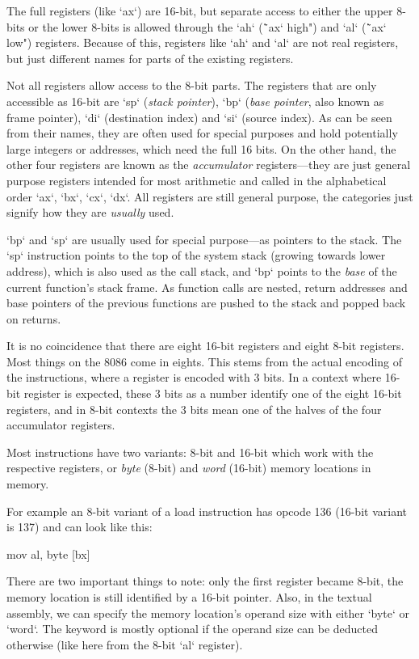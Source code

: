 The full registers (like
`ax`) are 16-bit, but separate access to either the upper 8-bits or the lower 8-bits
is allowed through the `ah` (\"`ax` high") and `al` (\"`ax` low") registers.
Because of this, registers like `ah` and `al` are not real registers, but just
different names for parts of the existing registers.

Not all registers allow access to the 8-bit parts. The registers that are only
accessible as 16-bit are `sp` ({\em stack pointer}), `bp` ({\em base pointer},
also known as frame pointer), `di` (destination index) and `si` (source index).
As can be seen from their names, they are often used for special purposes and
hold potentially large integers or addresses, which need the full 16 bits. On
the other hand, the other four registers are known as the {\em accumulator}
registers---they are just general purpose registers intended for most arithmetic
and called in the alphabetical order `ax`, `bx`, `cx`, `dx`. All registers are
still general purpose, the categories just signify how they are {\em
usually} used.

`bp` and `sp` are usually used for special purpose---as pointers to
the stack. The `sp` instruction points to the top of the system stack (growing
towards lower address), which is also used as
the call stack, and `bp` points to the {\em base} of the current function's stack
frame. As function calls are nested, return addresses and base pointers of the
previous functions are pushed to the stack and popped back on returns.

It is no coincidence that there are eight 16-bit registers and eight 8-bit registers.
Most things on the 8086 come in eights. This stems from the actual encoding of the
instructions, where a register is encoded with 3 bits. In a context where 16-bit
register is expected, these 3 bits as a number identify one of the eight 16-bit
registers, and in 8-bit contexts the 3 bits mean one of the halves of the
four accumulator registers.

Most instructions have two variants: 8-bit and 16-bit which work with the
respective registers, or {\em byte} (8-bit) and {\em word}
(16-bit) memory locations in memory.

For example an 8-bit variant of a load instruction has opcode 136 (16-bit
variant is 137) and can look like this:

\begtt
mov al, byte [bx]
\endtt

There are two important things to note: only the first register became 8-bit,
the memory location is still identified by a 16-bit pointer. Also, in the textual
assembly, we can specify the memory location's operand size with either
`byte` or `word`. The keyword is mostly optional if the operand size can be
deducted otherwise (like here from the 8-bit `al` register).

